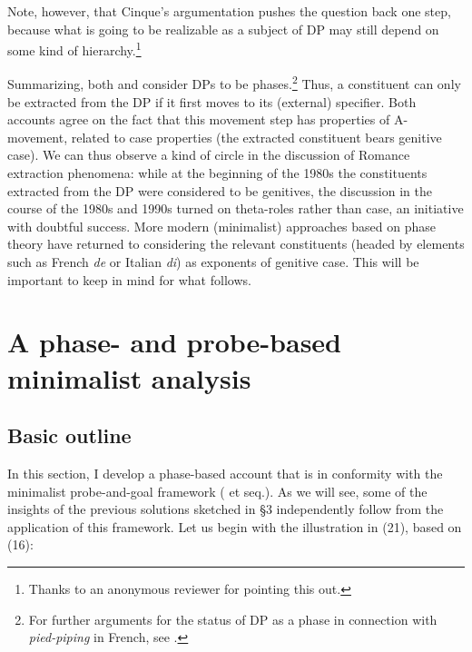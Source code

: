 \documentclass[output=paper]{langsci/langscibook}
\begin{document}
Note, however, that Cinque’s argumentation pushes the question back one step, because what is going to be realizable as a subject of DP may still depend on some kind of hierarchy.\footnote{Thanks to an anonymous reviewer for pointing this out.}

Summarizing, both \citet{Gutiérrez-Bravo2001} and \citet{Cinque2014} consider DPs to be phases.\footnote{For further arguments for the status of DP as a phase in connection with \textit{pied-piping} in French, see \citet{Heck2008}.} Thus, a constituent can only be extracted from the DP if it first moves to its (external) specifier. Both accounts agree on the fact that this movement step has properties of A-movement, related to case properties (the extracted constituent bears genitive case). We can thus observe a kind of circle in the discussion of Romance extraction phenomena: while at the beginning of the 1980s the constituents extracted from the DP were considered to be genitives, the discussion in the course of the 1980s and 1990s turned on theta-roles rather than case, an initiative with doubtful success. More modern (minimalist) approaches based on phase theory have returned to considering the relevant constituents (headed by elements such as French \textit{de} or Italian \textit{di}) as exponents of genitive case. This will be important to keep in mind for what follows.

\section{A phase- and probe-based minimalist analysis} %

\subsection{Basic outline}%

In this section, I develop a phase-based account that is in conformity with the minimalist probe-and-goal framework (\citealt{Chomsky2000} et seq.). As we will see, some of the insights of the previous solutions sketched in §3 independently follow from the application of this framework. Let us begin with the illustration in (21), based on (16):
\end{document}

